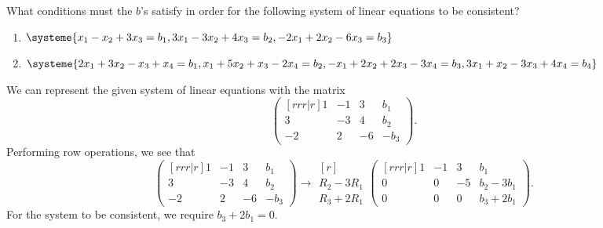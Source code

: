 \begin{problem}
    What conditions must the $b$'s satisfy in order for the following system of linear equations to be consistent?
    \begin{enumerate}
        \item $\systeme{x_1-x_2+3x_3=b_1,3x_1-3x_2+4x_3=b_2,-2x_1+2x_2-6x_3=b_3}$
        \item $\systeme{2x_1+3x_2-x_3+x_4=b_1,x_1+5x_2+x_3-2x_4=b_2,-x_1+2x_2+2x_3-3x_4=b_3,3x_1+x_2-3x_3+4x_4=b_4}$
    \end{enumerate}
\end{problem}
\begin{solution}
    \begin{ppart}
        We can represent the given system of linear equations with the matrix \[\begin{pmatrix}[rrr|r]1 & -1 & 3 & b_1 \\ 3 & -3 & 4 & b_2 \\ -2 & 2 & -6 & -b_3\end{pmatrix}.\] Performing row operations, we see that \[\begin{pmatrix}[rrr|r]1 & -1 & 3 & b_1 \\ 3 & -3 & 4 & b_2 \\ -2 & 2 & -6 & -b_3\end{pmatrix} \rightarrow \begin{matrix}[r] \\ \scriptstyle R_2 - 3R_1 \\ \scriptstyle R_3 + 2R_1\end{matrix} \begin{pmatrix}[rrr|r]1 & -1 & 3 & b_1 \\ 0 & 0 & -5 & b_2 - 3b_1 \\ 0 & 0 & 0 & b_3 + 2b_1\end{pmatrix}.\] For the system to be consistent, we require $b_3 + 2b_1 = 0$.
    \end{ppart}
    \begin{ppart}

\end{ppart}
\end{solution}
